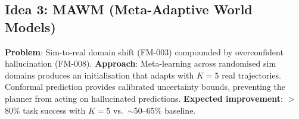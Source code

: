 \subsection*{Idea 3: MAWM (Meta-Adaptive World Models)}
\textbf{Problem}: Sim-to-real domain shift (FM-003) compounded by overconfident hallucination (FM-008).  \textbf{Approach}: Meta-learning across randomised sim domains produces an initialisation that adapts with $K{=}5$ real trajectories.  Conformal prediction provides calibrated uncertainty bounds, preventing the planner from acting on hallucinated predictions.  \textbf{Expected improvement}: $>$80\% task success with $K{=}5$ vs.\ $\sim$50--65\% baseline.